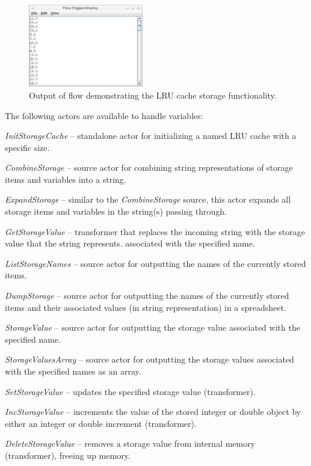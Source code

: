 \begin{figure}[htb]
  \centering
  \includegraphics[width=5.0cm]{images/floweditor-storage2_output.png}
  \caption{Output of flow demonstrating the LRU cache storage
  functionality.}
  \label{floweditor-storage2_output}
\end{figure}

The following actors are available to handle variables:
\begin{tight_itemize}
	\item \textit{InitStorageCache} -- standalone actor for initializing a named
	LRU cache with a specific size.
	\item \textit{CombineStorage} -- source actor for combining string 
	representations of storage items and variables into a string.
	\item \textit{ExpandStorage} -- similar to the \textit{CombineStorage}
	source, this actor expands all storage items and variables in the string(s) 
	passing through.
	\item \textit{GetStorageValue} -- transformer that replaces the incoming 
	string with the storage value that the string represents.
	associated with the specified name.
	\item \textit{ListStorageNames} -- source actor for outputting the names of 
	the currently stored items.
	\item \textit{DumpStorage} -- source actor for outputting the names of
	the currently stored items and their associated values (in string
	representation) in a spreadsheet.
	\item \textit{StorageValue} -- source actor for outputting the storage value
	associated with the specified name.
	\item \textit{StorageValuesArray} -- source actor for outputting the 
	storage values associated with the specified names as an array.
	\item \textit{SetStorageValue} -- updates the specified storage value
	(transformer).
	\item \textit{IncStorageValue} -- increments the value of the stored integer or
	double object by either an integer or double increment (transformer).
	\item \textit{DeleteStorageValue} -- removes a storage value
	from internal memory (transformer), freeing up memory.
\end{tight_itemize}


